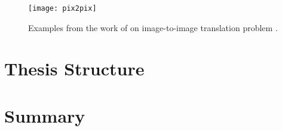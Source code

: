\begin{figure}[h!]
	\begin{center}
		\texttt{[image: pix2pix]}
	\end{center}
	
	\captionsetup{width=1\linewidth}
	\caption[Pix2Pix example from \citeauthor{image-to-image}]{Examples from the work of \citeauthor{image-to-image} on image-to-image translation problem \cite{image-to-image}.}
	\label{fig:img-to-img}
	\medskip
	
\end{figure}








\section{Thesis Structure}
\section{Summary}
